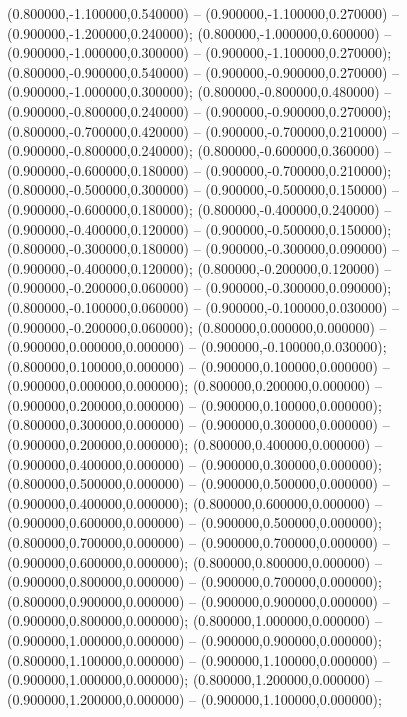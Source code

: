  (0.800000,-1.100000,0.540000) -- (0.900000,-1.100000,0.270000) -- (0.900000,-1.200000,0.240000);
 (0.800000,-1.000000,0.600000) -- (0.900000,-1.000000,0.300000) -- (0.900000,-1.100000,0.270000);
 (0.800000,-0.900000,0.540000) -- (0.900000,-0.900000,0.270000) -- (0.900000,-1.000000,0.300000);
 (0.800000,-0.800000,0.480000) -- (0.900000,-0.800000,0.240000) -- (0.900000,-0.900000,0.270000);
 (0.800000,-0.700000,0.420000) -- (0.900000,-0.700000,0.210000) -- (0.900000,-0.800000,0.240000);
 (0.800000,-0.600000,0.360000) -- (0.900000,-0.600000,0.180000) -- (0.900000,-0.700000,0.210000);
 (0.800000,-0.500000,0.300000) -- (0.900000,-0.500000,0.150000) -- (0.900000,-0.600000,0.180000);
 (0.800000,-0.400000,0.240000) -- (0.900000,-0.400000,0.120000) -- (0.900000,-0.500000,0.150000);
 (0.800000,-0.300000,0.180000) -- (0.900000,-0.300000,0.090000) -- (0.900000,-0.400000,0.120000);
 (0.800000,-0.200000,0.120000) -- (0.900000,-0.200000,0.060000) -- (0.900000,-0.300000,0.090000);
 (0.800000,-0.100000,0.060000) -- (0.900000,-0.100000,0.030000) -- (0.900000,-0.200000,0.060000);
 (0.800000,0.000000,0.000000) -- (0.900000,0.000000,0.000000) -- (0.900000,-0.100000,0.030000);
 (0.800000,0.100000,0.000000) -- (0.900000,0.100000,0.000000) -- (0.900000,0.000000,0.000000);
 (0.800000,0.200000,0.000000) -- (0.900000,0.200000,0.000000) -- (0.900000,0.100000,0.000000);
 (0.800000,0.300000,0.000000) -- (0.900000,0.300000,0.000000) -- (0.900000,0.200000,0.000000);
 (0.800000,0.400000,0.000000) -- (0.900000,0.400000,0.000000) -- (0.900000,0.300000,0.000000);
 (0.800000,0.500000,0.000000) -- (0.900000,0.500000,0.000000) -- (0.900000,0.400000,0.000000);
 (0.800000,0.600000,0.000000) -- (0.900000,0.600000,0.000000) -- (0.900000,0.500000,0.000000);
 (0.800000,0.700000,0.000000) -- (0.900000,0.700000,0.000000) -- (0.900000,0.600000,0.000000);
 (0.800000,0.800000,0.000000) -- (0.900000,0.800000,0.000000) -- (0.900000,0.700000,0.000000);
 (0.800000,0.900000,0.000000) -- (0.900000,0.900000,0.000000) -- (0.900000,0.800000,0.000000);
 (0.800000,1.000000,0.000000) -- (0.900000,1.000000,0.000000) -- (0.900000,0.900000,0.000000);
 (0.800000,1.100000,0.000000) -- (0.900000,1.100000,0.000000) -- (0.900000,1.000000,0.000000);
 (0.800000,1.200000,0.000000) -- (0.900000,1.200000,0.000000) -- (0.900000,1.100000,0.000000);
